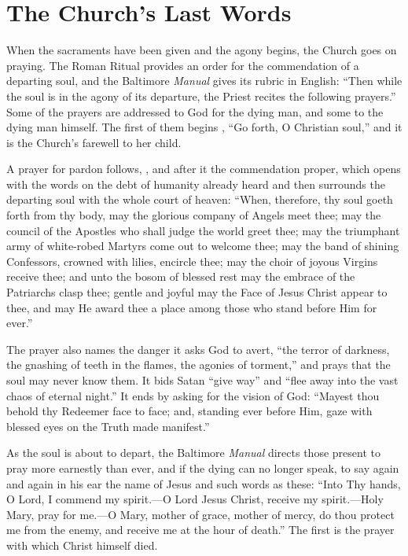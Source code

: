 \section{The Church's Last Words}

When the sacraments have been given and the agony begins, the Church goes on praying. The Roman Ritual provides an order for the commendation of a departing soul, and the Baltimore \emph{Manual} gives its rubric in English: ``Then while the soul is in the agony of its departure, the Priest recites the following prayers.'' Some of the prayers are addressed to God for the dying man, and some to the dying man himself. The first of them begins , ``Go forth, O Christian soul,'' and it is the Church's farewell to her child.

A prayer for pardon follows, , and after it the commendation proper, which opens with the words on the debt of humanity already heard and then surrounds the departing soul with the whole court of heaven: ``When, therefore, thy soul goeth forth from thy body, may the glorious company of Angels meet thee; may the council of the Apostles who shall judge the world greet thee; may the triumphant army of white-robed Martyrs come out to welcome thee; may the band of shining Confessors, crowned with lilies, encircle thee; may the choir of joyous Virgins receive thee; and unto the bosom of blessed rest may the embrace of the Patriarchs clasp thee; gentle and joyful may the Face of Jesus Christ appear to thee, and may He award thee a place among those who stand before Him for ever.''

The prayer also names the danger it asks God to avert, ``the terror of darkness, the gnashing of teeth in the flames, the agonies of torment,'' and prays that the soul may never know them. It bids Satan ``give way'' and ``flee away into the vast chaos of eternal night.'' It ends by asking for the vision of God: ``Mayest thou behold thy Redeemer face to face; and, standing ever before Him, gaze with blessed eyes on the Truth made manifest.''

As the soul is about to depart, the Baltimore \emph{Manual} directs those present to pray more earnestly than ever, and if the dying can no longer speak, to say again and again in his ear the name of Jesus and such words as these: ``Into Thy hands, O Lord, I commend my spirit.---O Lord Jesus Christ, receive my spirit.---Holy Mary, pray for me.---O Mary, mother of grace, mother of mercy, do thou protect me from the enemy, and receive me at the hour of death.'' The first is the prayer with which Christ himself died.

